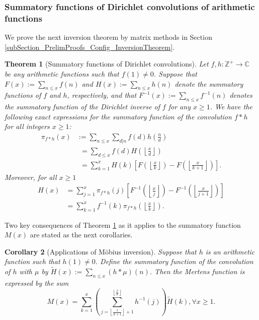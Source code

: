 \documentclass[11pt,reqno,a4letter]{article}
\numberwithin{figure}{section}
\numberwithin{table}{section}
\newcommand{\floor}[1]{\left\lfloor #1 \right\rfloor}
\newcommand{\Floor}[2]{\ensuremath{\left\lfloor \frac{#1}{#2} \right\rfloor}}
\theoremstyle{plain}
\newtheorem{theorem}{Theorem}
\newtheorem{cor}[theorem]{Corollary}
\numberwithin{theorem}{section}
\theoremstyle{definition}
\begin{document}
\subsubsection{Summatory functions of Dirichlet convolutions of arithmetic functions} 

We prove the next inversion theorem by matrix methods in 
Section \ref{subSection_PrelimProofs_Config_InversionTheorem}. 

\begin{theorem}[Summatory functions of Dirichlet convolutions] 
\label{theorem_SummatoryFuncsOfDirCvls} 
Let $f,h: \mathbb{Z}^{+} \rightarrow \mathbb{C}$ be any arithmetic functions such that $f(1) \neq 0$. 
Suppose that $F(x) := \sum_{n \leq x} f(n)$ and $H(x) := \sum_{n \leq x} h(n)$ denote the summatory 
functions of $f$ and $h$, respectively, and that $F^{-1}(x) := \sum_{n \leq x} f^{-1}(n)$ 
denotes the summatory function of the 
Dirichlet inverse of $f$ for any $x \geq 1$. We have the following exact expressions for the 
summatory function of the convolution $f \ast h$ for all integers $x \geq 1$: 
\begin{align*} 
\pi_{f \ast h}(x) & := \sum_{n \leq x} \sum_{d|n} f(d) h\left(\frac{n}{d}\right) \\ 
     & \phantom{:}= \sum_{d \leq x} f(d) H\left(\Floor{x}{d}\right) \\ 
     & \phantom{:}= \sum_{k=1}^{x} H(k) \left[F\left(\Floor{x}{k}\right) - 
     F\left(\Floor{x}{k+1}\right)\right]. 
\end{align*} 
Moreover, for all $x \geq 1$ 
\begin{align*} 
H(x) & = \sum_{j=1}^{x} \pi_{f \ast h}(j) \left[F^{-1}\left(\Floor{x}{j}\right) - 
     F^{-1}\left(\Floor{x}{j+1}\right)\right] \\ 
     & = \sum_{k=1}^{x} f^{-1}(k) \pi_{f \ast h}\left(\Floor{x}{k}\right). 
\end{align*} 
\end{theorem} 

Two key consequences of Theorem \ref{theorem_SummatoryFuncsOfDirCvls} 
as it applies to the summatory function $M(x)$ 
are stated as the next corollaries. 

\begin{cor}[Applications of M\"obius inversion] 
\label{cor_CvlGAstMu} 
Suppose that $h$ is an arithmetic function such that 
$h(1) \neq 0$. Define the summatory function of 
the convolution of $h$ with $\mu$ by $\widetilde{H}(x) := \sum_{n \leq x} (h \ast \mu)(n)$. 
Then the Mertens function is expressed by the sum 
\[
M(x) = \sum_{k=1}^{x} \left(\sum_{j=\floor{\frac{x}{k+1}}+1}^{\floor{\frac{x}{k}}} h^{-1}(j)\right) 
     \widetilde{H}(k), \forall x \geq 1. 
\]
\end{cor} 
\end{document}
